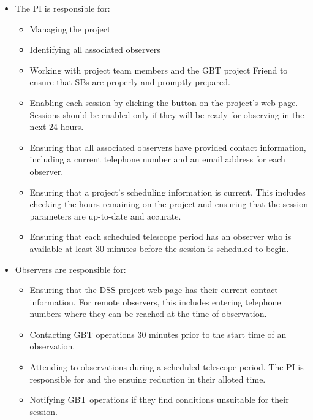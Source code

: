 \begin{itemize}[leftmargin=*]
\item The \gls{PI} is responsible for:\\
\vspace{-5mm}
\begin{itemize}[itemsep=1pt]
\item Managing the project
\item Identifying all associated observers
\item Working with project team members and the \gls{GBT} project Friend to ensure that
\glspl{SB} are properly and promptly prepared.
\item Enabling each session by clicking the  button on the project's web page.
Sessions should be enabled only if they will be ready for observing in the next 24 hours.
\item Ensuring that all associated observers have provided contact information,
including a current telephone number and an email address for each observer.
\item Ensuring that a project's scheduling information is current. This includes
checking the hours remaining on the project and ensuring that the session
parameters are up-to-date and accurate.
\item Ensuring that each scheduled telescope period has an observer who is available at
least 30 minutes before the session is scheduled to begin.
\end{itemize}
\item Observers are responsible for:\\
\vspace{-5mm}
\begin{itemize}[itemsep=1pt]
\item Ensuring that the \gls{DSS} project web page has their current contact information. For
remote observers, this includes entering telephone numbers where they can be
reached at the time of observation.
\item Contacting \gls{GBT} operations 30 minutes prior to the start time of an observation.
\item Attending to observations during a scheduled telescope period.  The \gls{PI} is responsible
for  and the ensuing reduction in their alloted time. 
\item Notifying \gls{GBT} operations if they find conditions unsuitable for their session.
\end{itemize}
\end{itemize}

